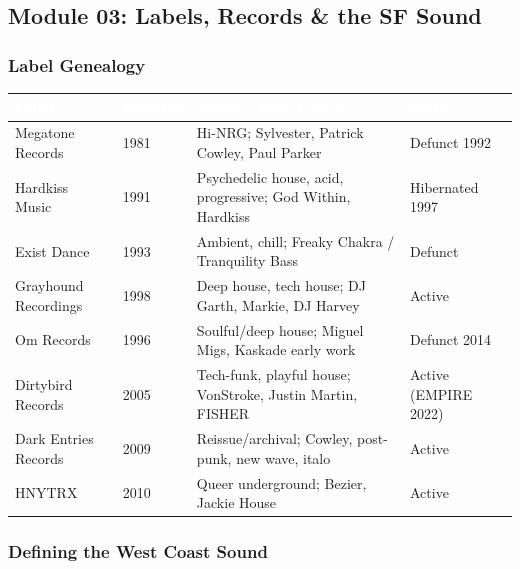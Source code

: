 \documentclass[11pt,letterpaper]{article}
\newcommand{\tableheader}[1]{\textbf{\sffamily\textcolor{white}{#1}}}
\begin{document}
\subsection{Module 03: Labels, Records \& the SF Sound}

\subsubsection{Label Genealogy}

\begin{center}
\begin{tabularx}{\textwidth}{L{3.5cm}C{1.8cm}XC{2cm}}
\toprule
{}
\tableheader{Label} & \tableheader{Founded} & \tableheader{Sound / Key Artists} & \tableheader{Status} \\
\midrule
Megatone Records & 1981 & Hi-NRG; Sylvester, Patrick Cowley, Paul Parker & Defunct 1992 \\
Hardkiss Music & 1991 & Psychedelic house, acid, progressive; God Within, Hardkiss & Hibernated 1997 \\
Exist Dance & 1993 & Ambient, chill; Freaky Chakra / Tranquility Bass & Defunct \\
Grayhound Recordings & 1998 & Deep house, tech house; DJ Garth, Markie, DJ Harvey & Active \\
Om Records & 1996 & Soulful/deep house; Miguel Migs, Kaskade early work & Defunct 2014 \\
Dirtybird Records & 2005 & Tech-funk, playful house; VonStroke, Justin Martin, FISHER & Active (EMPIRE 2022) \\
Dark Entries Records & 2009 & Reissue/archival; Cowley, post-punk, new wave, italo & Active \\
HNYTRX & 2010 & Queer underground; Bezier, Jackie House & Active \\
\bottomrule
\end{tabularx}
\end{center}

\subsubsection{Defining the West Coast Sound}
\end{document}
